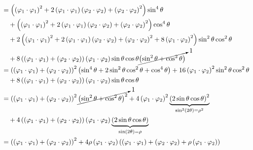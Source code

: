 \documentclass[11pt]{article}
\begin{document}
\begin{align*}
  &= \left( \left( \varphi_1\cdot\varphi_1 \right)^2 + 2 \left( \varphi_1\cdot\varphi_1 \right) \left( \varphi_2\cdot\varphi_2 \right) + \left( \varphi_2\cdot\varphi_2 \right)^2 \right) \sin^4 \theta \\
    & \quad + \left( \left( \varphi_1\cdot\varphi_1 \right)^2 + 2 \left( \varphi_1\cdot\varphi_1 \right) \left( \varphi_2\cdot\varphi_2 \right) + \left( \varphi_2\cdot\varphi_2 \right)^2 \right) \cos^4 \theta \\
    & \quad + 2 \left( \left( \varphi_1\cdot\varphi_1 \right)^2 + 2 \left( \varphi_1\cdot\varphi_1 \right) \left( \varphi_2\cdot\varphi_2 \right) + \left( \varphi_2\cdot\varphi_2 \right)^2+ 8 \left( \varphi_1\cdot\varphi_2 \right)^2  \right) \sin^2 \theta \cos^2 \theta \\
  & \quad + 8 \left( \left( \varphi_1\cdot\varphi_1 \right) + \left( \varphi_2\cdot\varphi_2 \right)  \right) \left( \varphi_1\cdot\varphi_2 \right) \sin \theta \cos \theta \cancelto{1}{\left( \sin^2 \theta + \cos^2 \theta \right)} \\
  &= \left( \left( \varphi_1\cdot\varphi_1 \right) + \left( \varphi_2\cdot\varphi_2 \right) \right)^2 \left( \sin^4 \theta + 2 \sin^2 \theta \cos^2 \theta + \cos^4 \theta \right) + 16 \left( \varphi_1\cdot\varphi_2 \right)^2 \sin^2 \theta \cos^2 \theta \\
    & \quad + 8 \left( \left( \varphi_1\cdot\varphi_1 \right) + \left( \varphi_2\cdot\varphi_2 \right)  \right) \left( \varphi_1\cdot\varphi_2 \right) \sin \theta \cos \theta \\
  &= \left( \left( \varphi_1\cdot\varphi_1 \right) + \left( \varphi_2\cdot\varphi_2 \right) \right)^2 \cancelto{1}{\left( \sin^2 \theta + \cos^2 \theta \right)^2} + 4 \left( \varphi_1\cdot\varphi_2 \right)^2 \underbrace{\left( 2 \sin \theta \cos \theta \right)^2}_{\sin^2 (2 \theta) = \rho^2} \\
    & \quad + 4 \left( \left( \varphi_1\cdot\varphi_1 \right) + \left( \varphi_2\cdot\varphi_2 \right)  \right) \left( \varphi_1\cdot\varphi_2 \right) \underbrace{\left( 2 \sin \theta \cos \theta \right)}_{\sin (2 \theta) = \rho} \\
  &= \left( \left( \varphi_1\cdot\varphi_1 \right) + \left( \varphi_2\cdot\varphi_2 \right) \right)^2 + 4 \rho \left( \varphi_1\cdot\varphi_2 \right) \left( \left( \varphi_1\cdot\varphi_1 \right) + \left( \varphi_2\cdot\varphi_2 \right) + \rho \left( \varphi_1\cdot\varphi_2 \right) \right) \\
\end{align*}
\end{document}
